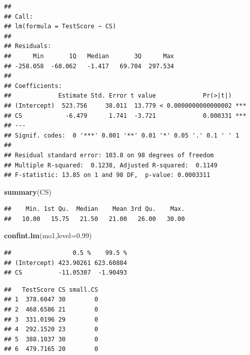 \documentclass[
]{book}
\newenvironment{Shaded}{\begin{snugshade}}{\end{snugshade}}
\newcommand{\DataTypeTok}[1]{\textcolor[rgb]{0.13,0.29,0.53}{#1}}
\newcommand{\DecValTok}[1]{\textcolor[rgb]{0.00,0.00,0.81}{#1}}
\newcommand{\FloatTok}[1]{\textcolor[rgb]{0.00,0.00,0.81}{#1}}
\newcommand{\KeywordTok}[1]{\textcolor[rgb]{0.13,0.29,0.53}{\textbf{#1}}}
\newcommand{\NormalTok}[1]{#1}
\newcommand{\OperatorTok}[1]{\textcolor[rgb]{0.81,0.36,0.00}{\textbf{#1}}}
\newcommand{\StringTok}[1]{\textcolor[rgb]{0.31,0.60,0.02}{#1}}
\begin{document}
\begin{verbatim}
## 
## Call:
## lm(formula = TestScore ~ CS)
## 
## Residuals:
##      Min       1Q   Median       3Q      Max 
## -258.058  -68.062   -1.417   69.704  297.534 
## 
## Coefficients:
##             Estimate Std. Error t value             Pr(>|t|)    
## (Intercept)  523.756     38.011  13.779 < 0.0000000000000002 ***
## CS            -6.479      1.741  -3.721             0.000331 ***
## ---
## Signif. codes:  0 '***' 0.001 '**' 0.01 '*' 0.05 '.' 0.1 ' ' 1
## 
## Residual standard error: 103.8 on 98 degrees of freedom
## Multiple R-squared:  0.1238, Adjusted R-squared:  0.1149 
## F-statistic: 13.85 on 1 and 98 DF,  p-value: 0.0003311
\end{verbatim}

\begin{Shaded}
\begin{Highlighting}[]
\KeywordTok{summary}\NormalTok{(CS)}
\end{Highlighting}
\end{Shaded}

\begin{verbatim}
##    Min. 1st Qu.  Median    Mean 3rd Qu.    Max. 
##   10.00   15.75   21.50   21.00   26.00   30.00
\end{verbatim}

\begin{Shaded}
\begin{Highlighting}[]
\KeywordTok{confint.lm}\NormalTok{(mo1,}\DataTypeTok{level=}\FloatTok{0.99}\NormalTok{)}
\end{Highlighting}
\end{Shaded}

\begin{verbatim}
##                 0.5 %    99.5 %
## (Intercept) 423.90261 623.60884
## CS          -11.05307  -1.90493
\end{verbatim}

\begin{Shaded}
\end{Shaded}

\begin{verbatim}
##   TestScore CS small.CS
## 1  378.6047 30        0
## 2  468.6586 21        0
## 3  331.0196 29        0
## 4  292.1520 23        0
## 5  388.1037 30        0
## 6  479.7165 20        0
\end{verbatim}
\end{document}
